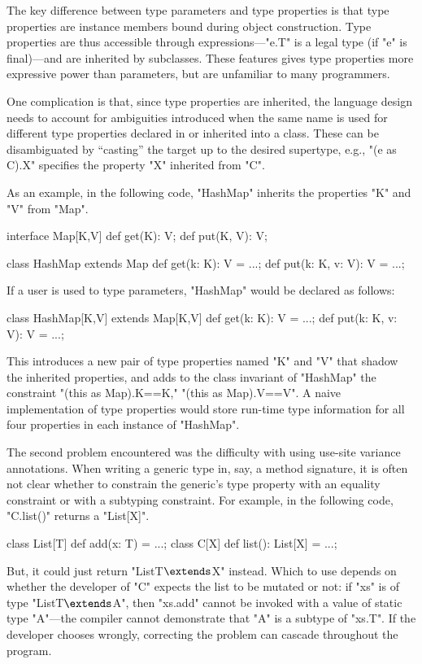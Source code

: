 The key difference between type parameters and type properties
is that type properties are
instance members bound during object construction.  Type
properties are thus accessible through expressions---\xcd"e.T" is
a legal type (if \xcd"e" is final)---and are inherited by subclasses.
These features gives type properties more expressive power than
parameters, but are unfamiliar to many programmers.

One complication is that,
since type properties are inherited, the language design needs
to account for ambiguities introduced when the same name is
used for different type properties declared in or inherited into a class.
These can be disambiguated
by ``casting'' the target up to the desired supertype,
e.g., \xcd"(e as C).X" specifies
the property \xcd"X" inherited from \xcd"C".

As an example, in the following \Xten code, \xcd"HashMap" 
inherits the properties \xcd"K" and \xcd"V" from \xcd"Map".
\begin{xten}
interface Map[K,V] {
  def get(K): V;
  def put(K, V): V;
}

class HashMap extends Map {
  def get(k: K): V = ...;
  def put(k: K, v: V): V = ...;
}
\end{xten}
If a user is used to type parameters, \xcd"HashMap" would be
declared as follows:
\begin{xten}
class HashMap[K,V] extends Map[K,V] {
  def get(k: K): V = ...;
  def put(k: K, v: V): V = ...;
}
\end{xten}
This introduces a new pair of type properties named \xcd"K" and
\xcd"V" that shadow the inherited properties,
and adds to the class invariant of \xcd"HashMap" the constraint
\xcd"{(this as Map).K==K," \xcd"(this as Map).V==V}".
A naive implementation of type properties would store run-time
type information for all four properties in each instance
of \xcd"HashMap".

\ifwild
The second problem encountered was the difficulty with using use-site
variance annotations.
When writing a generic type in, say, a method signature, it is often not 
clear whether to constrain the generic's type property with an
equality constraint or with a subtyping constraint.
For example, in the following code, \xcd"C.list()" returns a \xcd"List[X]".
\begin{xtenmath}
class List[T] {
  def add(x: T) = ...;
}
class C[X] {
  def list(): List[X] = ...;
}
\end{xtenmath}
\noindent
But, it could just return
\xcdmath"List{T$\extends$X}" instead.
Which to use depends on whether the developer of \xcd"C"
expects the list to be mutated or not: if \xcd"xs"
is of type
\xcdmath"List{T$\extends$A}", then \xcd"xs.add" cannot be
invoked with a value of static type \xcd"A"---the compiler
cannot demonstrate that \xcd"A" is a subtype of \xcd"xs.T".
If the developer chooses wrongly, correcting the problem can
cascade throughout the program.
\fi

